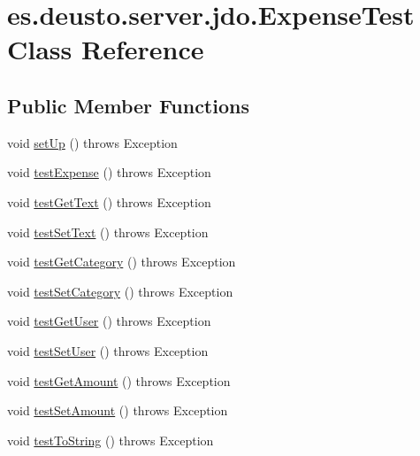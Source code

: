 \hypertarget{classes_1_1deusto_1_1server_1_1jdo_1_1_expense_test}{}\section{es.\+deusto.\+server.\+jdo.\+Expense\+Test Class Reference}
\label{classes_1_1deusto_1_1server_1_1jdo_1_1_expense_test}
\subsection*{Public Member Functions}
\begin{DoxyCompactItemize}
\item 
void \hyperlink{classes_1_1deusto_1_1server_1_1jdo_1_1_expense_test_a6e23388add90f6a9465a6befc55978c2}{set\+Up} ()  throws Exception 
\item 
void \hyperlink{classes_1_1deusto_1_1server_1_1jdo_1_1_expense_test_a90db3b35017b6000665199694d7f715d}{test\+Expense} ()  throws Exception 
\item 
void \hyperlink{classes_1_1deusto_1_1server_1_1jdo_1_1_expense_test_a07a19f73b071030eea8864b86e394794}{test\+Get\+Text} ()  throws Exception 
\item 
void \hyperlink{classes_1_1deusto_1_1server_1_1jdo_1_1_expense_test_a766834aa2f51b6aacc54dd13b43b2f6f}{test\+Set\+Text} ()  throws Exception 
\item 
void \hyperlink{classes_1_1deusto_1_1server_1_1jdo_1_1_expense_test_a137a49175ad33ab63b53a6c4d1fc56ae}{test\+Get\+Category} ()  throws Exception 
\item 
void \hyperlink{classes_1_1deusto_1_1server_1_1jdo_1_1_expense_test_aa338c93917012381fe92904b764384b1}{test\+Set\+Category} ()  throws Exception 
\item 
void \hyperlink{classes_1_1deusto_1_1server_1_1jdo_1_1_expense_test_a2b21c0ad0d040cfed79bb52c9123e3d0}{test\+Get\+User} ()  throws Exception 
\item 
void \hyperlink{classes_1_1deusto_1_1server_1_1jdo_1_1_expense_test_a54d2e8a158f8a3d22df5a68074ce4c1e}{test\+Set\+User} ()  throws Exception 
\item 
void \hyperlink{classes_1_1deusto_1_1server_1_1jdo_1_1_expense_test_a18a3c76cb6200e9cbeb2f88a41f7a39c}{test\+Get\+Amount} ()  throws Exception 
\item 
void \hyperlink{classes_1_1deusto_1_1server_1_1jdo_1_1_expense_test_a14edb47f18e79d658398ecba6defbb46}{test\+Set\+Amount} ()  throws Exception 
\item 
void \hyperlink{classes_1_1deusto_1_1server_1_1jdo_1_1_expense_test_a3ad0e782abaa1880cc5f0b6f3dab2759}{test\+To\+String} ()  throws Exception
\end{DoxyCompactItemize}


